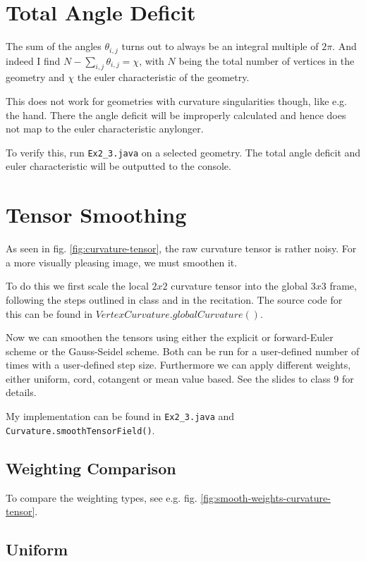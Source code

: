 \documentclass[a4paper,10pt,notitlepage]{scrreprt}
\begin{document}
\section{Total Angle Deficit}

The sum of the angles $\theta_{i,j}$ turns out to always be an integral multiple
of $2 \pi$. And indeed I find $N - \sum_{i,j} \theta_{i,j} = \chi$, with $N$
being the total number of vertices in the geometry and $\chi$ the euler
characteristic of the geometry.

This does not work for geometries with curvature singularities
though, like e.g. the hand. There the angle deficit will be
improperly calculated and hence does not map to the euler
characteristic anylonger.

To verify this, run \texttt{Ex2\_3.java} on a selected geometry. The total angle
deficit and euler characteristic will be outputted to the console.

\section{Tensor Smoothing}

As seen in fig. \ref{fig:curvature-tensor}, the raw curvature tensor is rather
noisy. For a more visually pleasing image, we must smoothen it.

To do this we first scale the local $2x2$ curvature tensor into the global
$3x3$ frame, following the steps outlined in class and in the recitation. The
source code for this can be found in $VertexCurvature.globalCurvature()$.

Now we can smoothen the tensors using either the explicit or forward-Euler
scheme or the Gauss-Seidel scheme. Both can be run for a user-defined number of
times with a user-defined step size. Furthermore we can apply different
weights, either uniform, cord, cotangent or mean value based. See the slides to
class 9 for details.

My implementation can be found in \texttt{Ex2\_3.java} and
\texttt{Curvature.smoothTensorField()}.

\subsection{Weighting Comparison}

To compare the weighting types, see e.g. fig.
\ref{fig:smooth-weights-curvature-tensor}.

\subsection{Uniform}
\end{document}
